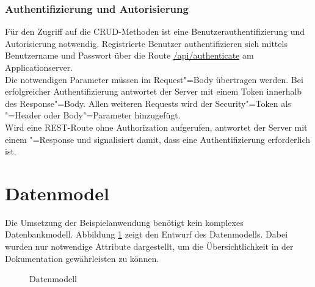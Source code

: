 \subsubsection{Authentifizierung und Autorisierung} 

Für den Zugriff auf die CRUD-Methoden ist eine Benutzerauthentifizierung und Autorisierung notwendig. Registrierte Benutzer authentifizieren sich mittels Benutzername und Passwort über die Route \url{/api/authenticate} am Applicationserver. \\
Die notwendigen Parameter müssen im Request"=Body übertragen werden. Bei erfolgreicher Authentifizierung antwortet der Server mit einem Token innerhalb des Response"=Body. Allen weiteren Requests wird der Security"=Token als "=Header oder Body"=Parameter hinzugefügt. \\
Wird eine REST-Route ohne Authorization aufgerufen, antwortet der Server mit einem "=Response und signalisiert damit, dass eine Authentifizierung erforderlich ist. 

\section{Datenmodel}
\label{sec_konzeption_datamodel}

Die Umsetzung der Beispielanwendung benötigt kein komplexes Datenbankmodell. Abbildung \ref{image_konzeption_datenmodell} zeigt den Entwurf des Datenmodells. Dabei wurden nur notwendige Attribute dargestellt, um die Übersichtlichkeit in der Dokumentation gewährleisten zu können. \\

\begin{figure}[htp] 
\caption{Datenmodell}
\label{image_konzeption_datenmodell}
\end{figure} 

